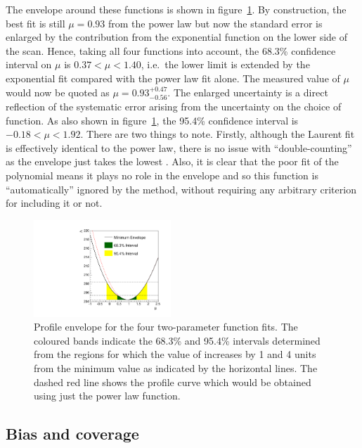 The envelope around these functions is shown in
figure~\ref{fig:functions:envelope}.
By construction, the best fit is still $\mu=0.93$ from the power law
but now the standard error is enlarged by the contribution from the exponential function
on the lower side of the scan. Hence, taking all four functions into
account, the 68.3\% confidence interval on $\mu$ is
$0.37 < \mu < 1.40 $, i.e.~the lower limit is extended by
the exponential fit
compared with the power law fit alone.
The measured value of $\mu$ would now be quoted as
$\mu = 0.93_{-0.56}^{+0.47}$.
The enlarged uncertainty is a direct reflection of the
systematic error arising from the uncertainty on the choice of function.
As also shown in figure~\ref{fig:functions:envelope}, the 95.4\% confidence
interval is $-0.18 < \mu < 1.92$.
There are two things to note. Firstly, although the Laurent fit
is effectively identical to the power law, there is no issue with
``double-counting'' as the envelope just takes the lowest \nll.
Also, it is clear that the poor fit of the polynomial
means it plays no role in the envelope and so this function is
``automatically'' ignored by the method,
without requiring any arbitrary criterion for
including it or not.
%
\begin{figure}[tbp]
\centering
\includegraphics[width=0.46\textwidth]{functions/Envelope.pdf}
\caption{Profile \nll envelope for the four two-parameter function fits.
The coloured bands indicate the 68.3\% and 95.4\% intervals determined from the regions
for which the value of \nll increases by 1 and 4 units from the minimum value as indicated by the horizontal lines. The dashed red line shows the profile \nll
curve which would be obtained using just the power law function.}
\label{fig:functions:envelope}
\end{figure}


\subsection{Bias and coverage}
\label{sec:functions:coverage}

